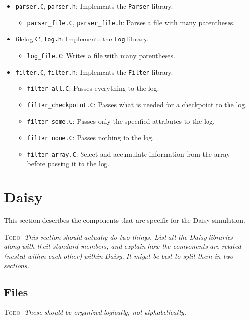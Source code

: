 \documentclass{article}
\newcommand{\code}[1]{\texttt{#1}}
\newcommand{\file}[1]{\texttt{#1}}
\newcommand{\todo}[1]{\textsc{Todo}: \textit{#1}}
\begin{document}
\begin{itemize}
\item \file{parser.C}, \file{parser.h}: Implements the \code{Parser}
  library.
  \begin{itemize}
  \item \file{parser\_file.C}, \file{parser\_file.h}:  Parses a file
    with many parentheses.
  \end{itemize}
\item file{log.C}, \file{log.h}: Implements the \code{Log} library.
  \begin{itemize}
  \item \file{log\_file.C}:  Writes a file with many parentheses.
  \end{itemize}
\item \file{filter.C}, \file{filter.h}: Implements the \code{Filter}
  library. 
  \begin{itemize}
  \item \file{filter\_all.C}: Passes everything to the log. 
  \item \file{filter\_checkpoint.C}: Passes what is needed for a
    checkpoint to the log.
  \item \file{filter\_some.C}: Passes only the specified attributes to
    the log.
  \item \file{filter\_none.C}: Passes nothing to the log.
  \item \file{filter\_array.C}: Select and accumulate information from
    the array before passing it to the log.
  \end{itemize}
\end{itemize}

\section{Daisy}
\label{daisy}

This section describes the components that are specific for the Daisy
simulation.

\todo{This section should actually do two things.  List all the Daisy
  libraries along with theit standard members, and explain how the
  components are related (nested within each other) within Daisy.  It
  might be best to split them in two sections.}

\subsection{Files}

\todo{These should be organized logically, not alphabetically.}
\end{document}
